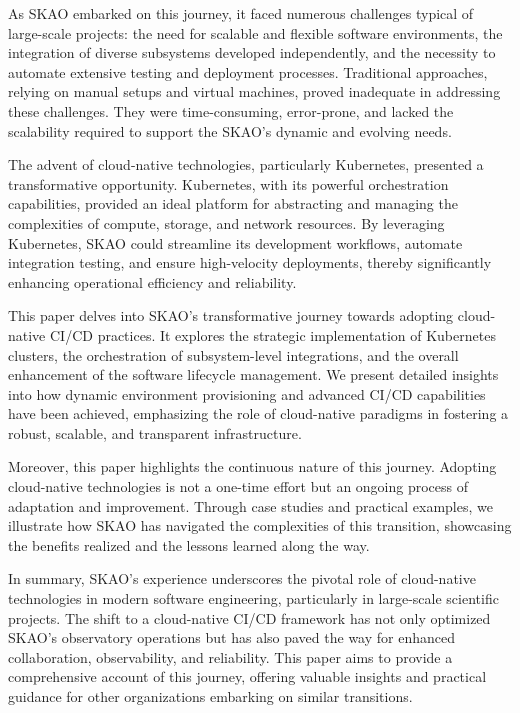 \documentclass[a4paper]{spie}  %
\begin{document}
As SKAO embarked on this journey, it faced numerous challenges typical of large-scale projects: the need for scalable and flexible software environments, the integration of diverse subsystems developed independently, and the necessity to automate extensive testing and deployment processes. Traditional approaches, relying on manual setups and virtual machines, proved inadequate in addressing these challenges. They were time-consuming, error-prone, and lacked the scalability required to support the SKAO's dynamic and evolving needs.

The advent of cloud-native technologies, particularly Kubernetes, presented a transformative opportunity. Kubernetes, with its powerful orchestration capabilities, provided an ideal platform for abstracting and managing the complexities of compute, storage, and network resources. By leveraging Kubernetes, SKAO could streamline its development workflows, automate integration testing, and ensure high-velocity deployments, thereby significantly enhancing operational efficiency and reliability.

This paper delves into SKAO's transformative journey towards adopting cloud-native CI/CD practices. It explores the strategic implementation of Kubernetes clusters, the orchestration of subsystem-level integrations, and the overall enhancement of the software lifecycle management. We present detailed insights into how dynamic environment provisioning and advanced CI/CD capabilities have been achieved, emphasizing the role of cloud-native paradigms in fostering a robust, scalable, and transparent infrastructure.

Moreover, this paper highlights the continuous nature of this journey. Adopting cloud-native technologies is not a one-time effort but an ongoing process of adaptation and improvement. Through case studies and practical examples, we illustrate how SKAO has navigated the complexities of this transition, showcasing the benefits realized and the lessons learned along the way.

In summary, SKAO's experience underscores the pivotal role of cloud-native technologies in modern software engineering, particularly in large-scale scientific projects. The shift to a cloud-native CI/CD framework has not only optimized SKAO's observatory operations but has also paved the way for enhanced collaboration, observability, and reliability. This paper aims to provide a comprehensive account of this journey, offering valuable insights and practical guidance for other organizations embarking on similar transitions.
\end{document}
